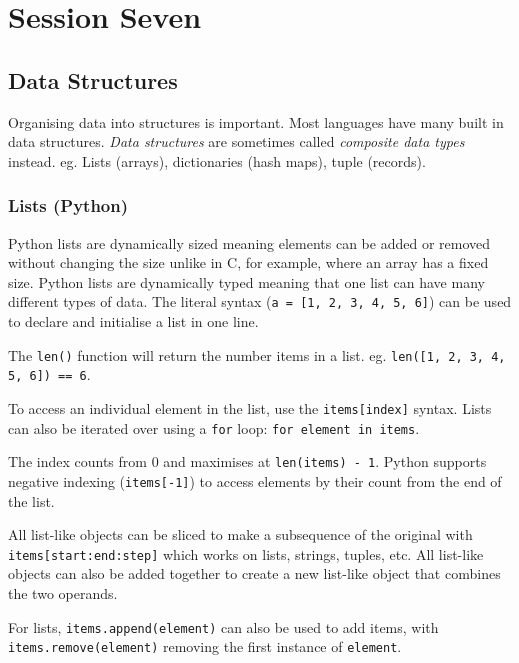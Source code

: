 \section{Session Seven}\label{sec:session_seven}

\subsection{Data Structures}\label{sub:data_structures}

Organising data into structures is important.
Most languages have many built in data structures.
\emph{Data structures} are sometimes called \emph{composite data types} instead.
eg. Lists (arrays), dictionaries (hash maps), tuple (records).

\subsubsection{Lists (Python)}\label{ssub:lists_python_}

Python lists are dynamically sized meaning elements can be added or removed without changing the size unlike in C, for example, where an array has a fixed size.
Python lists are dynamically typed meaning that one list can have many different types of data.
The literal syntax (\texttt{a = [1, 2, 3, 4, 5, 6]}) can be used to declare and initialise a list in one line.

The \texttt{len()} function will return the number items in a list. eg. \texttt{len([1, 2, 3, 4, 5, 6]) == 6}.

To access an individual element in the list, use the \texttt{items[index]} syntax.
Lists can also be iterated over using a \texttt{for} loop: \texttt{for element in items}.

The index counts from \(0\) and maximises at \texttt{len(items) - 1}.
Python supports negative indexing (\texttt{items[-1]}) to access elements by their count from the end of the list.

All list-like objects can be sliced to make a subsequence of the original with \texttt{items[start:end:step]} which works on lists, strings, tuples, etc.
All list-like objects can also be added together to create a new list-like object that combines the two operands.

For lists, \texttt{items.append(element)} can also be used to add items, with \texttt{items.remove(element)} removing the first instance of \texttt{element}.

